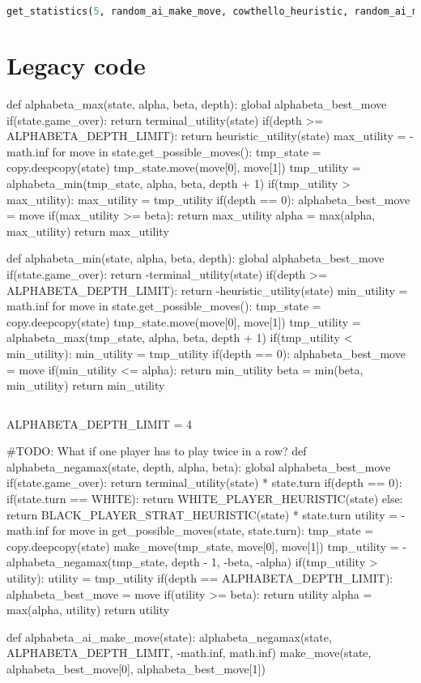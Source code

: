 \begin{lstlisting}[language=Python]
get_statistics(5, random_ai_make_move, cowthello_heuristic, random_ai_make_move, cowthello_heuristic)
\end{lstlisting}

\hypertarget{legacy-code}{%
\section{Legacy code}\label{legacy-code}}

def alphabeta\_max(state, alpha, beta, depth): global
alphabeta\_best\_move if(state.game\_over): return
terminal\_utility(state) if(depth \textgreater=
ALPHABETA\_DEPTH\_LIMIT): return heuristic\_utility(state) max\_utility
= -math.inf for move in state.get\_possible\_moves(): tmp\_state =
copy.deepcopy(state) tmp\_state.move(move{[}0{]}, move{[}1{]})
tmp\_utility = alphabeta\_min(tmp\_state, alpha, beta, depth + 1)
if(tmp\_utility \textgreater{} max\_utility): max\_utility =
tmp\_utility if(depth == 0): alphabeta\_best\_move = move
if(max\_utility \textgreater= beta): return max\_utility alpha =
max(alpha, max\_utility) return max\_utility

def alphabeta\_min(state, alpha, beta, depth): global
alphabeta\_best\_move if(state.game\_over): return
-terminal\_utility(state) if(depth \textgreater=
ALPHABETA\_DEPTH\_LIMIT): return -heuristic\_utility(state) min\_utility
= math.inf for move in state.get\_possible\_moves(): tmp\_state =
copy.deepcopy(state) tmp\_state.move(move{[}0{]}, move{[}1{]})
tmp\_utility = alphabeta\_max(tmp\_state, alpha, beta, depth + 1)
if(tmp\_utility \textless{} min\_utility): min\_utility = tmp\_utility
if(depth == 0): alphabeta\_best\_move = move if(min\_utility \textless=
alpha): return min\_utility beta = min(beta, min\_utility) return
min\_utility

\begin{lstlisting}[language=Python]
\end{lstlisting}

ALPHABETA\_DEPTH\_LIMIT = 4

\#TODO: What if one player has to play twice in a row? def
alphabeta\_negamax(state, depth, alpha, beta): global
alphabeta\_best\_move if(state.game\_over): return
terminal\_utility(state) * state.turn if(depth == 0): if(state.turn ==
WHITE): return WHITE\_PLAYER\_HEURISTIC(state) else: return
BLACK\_PLAYER\_STRAT\_HEURISTIC(state) * state.turn utility = -math.inf
for move in get\_possible\_moves(state, state.turn): tmp\_state =
copy.deepcopy(state) make\_move(tmp\_state, move{[}0{]}, move{[}1{]})
tmp\_utility = -alphabeta\_negamax(tmp\_state, depth - 1, -beta, -alpha)
if(tmp\_utility \textgreater{} utility): utility = tmp\_utility if(depth
== ALPHABETA\_DEPTH\_LIMIT): alphabeta\_best\_move = move if(utility
\textgreater= beta): return utility alpha = max(alpha, utility) return
utility

def alphabeta\_ai\_make\_move(state): alphabeta\_negamax(state,
ALPHABETA\_DEPTH\_LIMIT, -math.inf, math.inf) make\_move(state,
alphabeta\_best\_move{[}0{]}, alphabeta\_best\_move{[}1{]})
